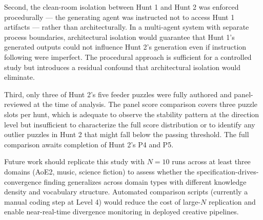 Second, the clean-room isolation between Hunt 1 and Hunt 2 was enforced procedurally --- the generating agent was instructed not to access Hunt 1 artifacts --- rather than architecturally. In a multi-agent system with separate process boundaries, architectural isolation would guarantee that Hunt 1's generated outputs could not influence Hunt 2's generation even if instruction following were imperfect. The procedural approach is sufficient for a controlled study but introduces a residual confound that architectural isolation would eliminate.

Third, only three of Hunt 2's five feeder puzzles were fully authored and panel-reviewed at the time of analysis. The panel score comparison covers three puzzle slots per hunt, which is adequate to observe the stability pattern at the direction level but insufficient to characterize the full score distribution or to identify any outlier puzzles in Hunt 2 that might fall below the passing threshold. The full comparison awaits completion of Hunt 2's P4 and P5.

Future work should replicate this study with $N = 10$ runs across at least three domains (AoE2, music, science fiction) to assess whether the specification-drives-convergence finding generalizes across domain types with different knowledge density and vocabulary structure. Automated comparison scripts (currently a manual coding step at Level 4) would reduce the cost of large-$N$ replication and enable near-real-time divergence monitoring in deployed creative pipelines.
